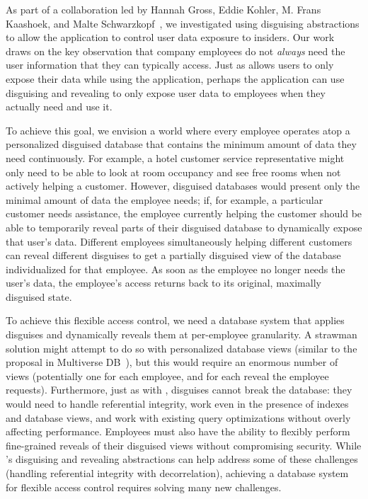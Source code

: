 %
As part of a collaboration led by Hannah Gross, Eddie Kohler, M. Frans Kaashoek,
and Malte Schwarzkopf~\cite{funhouse}, we investigated using disguising
abstractions to allow the application to control user data exposure to insiders.
%
Our work draws on the key observation that company employees do not \emph{always}
need the user information that they can typically access.
%
Just as \sys allows users to only expose their data while using the application,
perhaps the application can use disguising and revealing to only expose user
data to employees when they actually need and use it.
%

%
To achieve this goal, we envision a world where every employee operates atop a
personalized disguised database that contains the minimum amount of data they
need continuously. For example, a hotel customer service representative might
only need to be able to look at room occupancy and see free rooms when not
actively helping a customer.
%
%
However, disguised databases would present only the minimal amount of data the
employee needs; if, for example, a particular customer needs assistance, the
employee currently helping the customer should be able to temporarily reveal
parts of their disguised database to dynamically expose that user's data.
%
Different employees simultaneously helping different customers can reveal
different disguises to get a partially disguised view of the database
individualized for that employee.
%
As soon as the employee no longer needs the user's data, the employee’s access
returns back to its original, maximally disguised state.
%

%
To achieve this flexible access control, we need a database
system that applies disguises and dynamically reveals them at per-employee
granularity.
%
A strawman solution might attempt to do so with personalized database views
(similar to the proposal in Multiverse DB~\cite{multiverse}), but this would
require an enormous number of views (potentially one for each employee, and for
each reveal the employee requests).
%
Furthermore, just as with \sys, disguises cannot break the database: they would
need to handle referential integrity, work even in the presence of indexes and
database views, and work with existing query optimizations without overly
affecting performance.
%
Employees must also have the ability to flexibly perform fine-grained reveals of
their disguised views without compromising security.
%
While \sys's disguising and revealing abstractions can help address some of
these challenges (\eg handling referential integrity with decorrelation),
achieving a database system for flexible access control requires solving many
new challenges.

